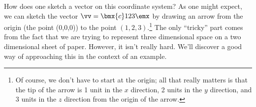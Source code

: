 How does one sketch a vector on this coordinate system? As one might expect, we can sketch the vector $\vv = \bmx{c} 1\\2\\3\emx$ by drawing an arrow from the origin (the point (0,0,0)) to the point $(1,2,3)$.\footnote{Of course, we don't have to start at the origin; all that really matters is that the tip of the arrow is 1 unit in the $x$ direction, 2 units in the $y$ direction, and 3 units in the $z$ direction from the origin of the arrow.} The only ``tricky'' part comes from the fact that we are trying to represent three dimensional space on a two dimensional sheet of paper. However, it isn't really hard. We'll discover a good way of approaching this in the context of an example.

\medskip

